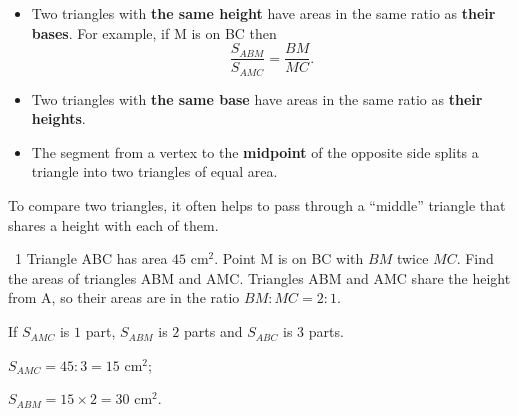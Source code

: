 \begin{knowbox}
\begin{minipage}[t]{0.6\linewidth}
\begin{itemize}[leftmargin=1.4em,itemsep=3pt]
\item Two triangles with \textbf{the same height} have areas in the same ratio as \textbf{their bases}. For example, if M is on BC then
\[\frac{S_{ABM}}{S_{AMC}}=\frac{BM}{MC}.\]
\item Two triangles with \textbf{the same base} have areas in the same ratio as \textbf{their heights}.
\item The segment from a vertex to the \textbf{midpoint} of the opposite side splits a triangle into two triangles of equal area.
\end{itemize}
To compare two triangles, it often helps to pass through a ``middle'' triangle that shares a height with each of them.
\end{minipage}\hfill
\begin{minipage}[t]{0.36\linewidth}\vspace{4pt}\centering
{}
\end{minipage}
\end{knowbox}
\gap
\begin{exbox}{\ExWord\ 1}
Triangle ABC has area $45$ cm$^2$. Point M is on BC with $BM$ twice $MC$. Find the areas of triangles ABM and AMC.
\guide
Triangles ABM and AMC share the height from A, so their areas are in the ratio $BM:MC=2:1$.\par If $S_{AMC}$ is $1$ part, $S_{ABM}$ is $2$ parts and $S_{ABC}$ is $3$ parts.\par
$S_{AMC}=45:3=15$ cm$^2$;\par $S_{ABM}=15\times2=30$ cm$^2$.
\end{exbox}
\gap

